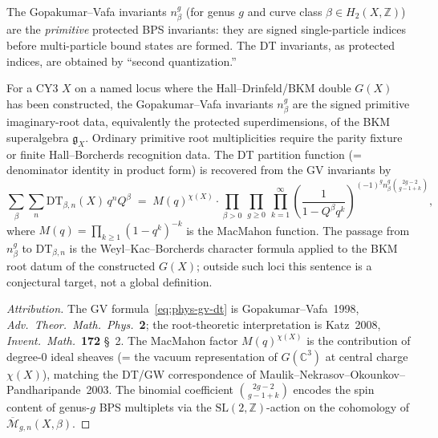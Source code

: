 The Gopakumar--Vafa invariants $n^g_\beta$ (for genus $g$ and curve class $\beta \in H_2(X, \mathbb{Z})$) are the \emph{primitive} protected BPS invariants: they are signed single-particle indices before multi-particle bound states are formed. The DT invariants, as protected indices, are obtained by ``second quantization.''

\begin{proposition}
\label{prop:phys-gv-prim-root}
For a CY3 $X$ on a named locus where the Hall--Drinfeld/BKM double $G(X)$ has been constructed, the Gopakumar--Vafa invariants $n^g_\beta$ are the signed primitive imaginary-root data, equivalently the protected superdimensions, of the BKM superalgebra $\mathfrak{g}_X$. Ordinary primitive root multiplicities require the parity fixture or finite Hall--Borcherds recognition data. The DT partition function (= denominator identity in product form) is recovered from the GV invariants by
\begin{equation}\label{eq:phys-gv-dt}
\sum_{\beta} \sum_{n} \mathrm{DT}_{\beta,n}(X)\, q^n Q^\beta
\;=\;
M(q)^{\chi(X)} \cdot
\prod_{\beta > 0}\, \prod_{g \geq 0}\, \prod_{k=1}^\infty
\left(\frac{1}{1 - Q^\beta q^k}\right)^{(-1)^g n^g_\beta \binom{2g-2}{g-1+k}},
\end{equation}
where $M(q) = \prod_{k \geq 1}(1-q^k)^{-k}$ is the MacMahon function. The passage from $n^g_\beta$ to $\mathrm{DT}_{\beta,n}$ is the Weyl--Kac--Borcherds character formula applied to the BKM root datum of the constructed $G(X)$; outside such loci this sentence is a conjectural target, not a global definition.
\end{proposition}

\begin{proof}[Attribution]
The GV formula~\eqref{eq:phys-gv-dt} is Gopakumar--Vafa~1998, \emph{Adv.\ Theor.\ Math.\ Phys.}~\textbf{2}; the root-theoretic interpretation is Katz~2008, \emph{Invent.\ Math.}~\textbf{172} \S~2. The MacMahon factor $M(q)^{\chi(X)}$ is the contribution of degree-0 ideal sheaves (= the vacuum representation of $G(\mathbb{C}^3)$ at central charge $\chi(X)$), matching the DT/GW correspondence of Maulik--Nekrasov--Okounkov--Pandharipande~2003. The binomial coefficient $\binom{2g-2}{g-1+k}$ encodes the spin content of genus-$g$ BPS multiplets via the $\mathrm{SL}(2,\mathbb{Z})$-action on the cohomology of $\overline{\mathcal{M}}_{g,n}(X, \beta)$.
\end{proof}

